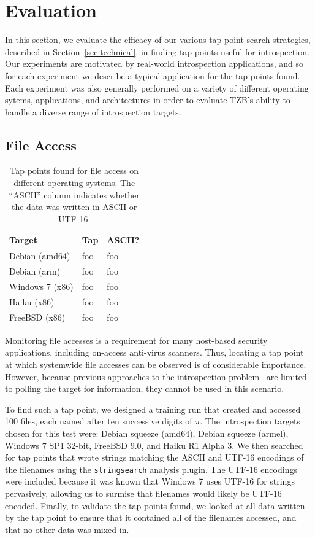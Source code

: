 \section{Evaluation}
\label{sec:eval}

In this section, we evaluate the efficacy of our various tap point search
strategies, described in Section~\ref{sec:technical}, in finding tap
points useful for introspection. Our experiments are motivated by
real-world introspection applications, and so for each experiment we
describe a typical application for the tap points found. Each experiment
was also generally performed on a variety of different operating sytems,
applications, and architectures in order to evaluate TZB's ability to
handle a diverse range of introspection targets.

\subsection{File Access}
\label{sec:eval:subsec:file}

\begin{table}
    \centering
    \begin{tabular}{|l|l|l|}
        \hline
        Target & Tap & ASCII? \\
        \hline
        Debian (amd64) & foo & foo \\ 
        Debian (arm) & foo & foo \\
        Windows 7 (x86) & foo & foo \\
        Haiku (x86) & foo & foo \\
        FreeBSD (x86) & foo & foo \\
        \hline
    \end{tabular}
\caption{Tap points found for file access on different operating
systems. The ``ASCII'' column indicates whether the data was written in
ASCII or UTF-16.}
\label{tbl:file}
\end{table}

Monitoring file accesses is a requirement for many host-based security
applications, including on-access anti-virus scanners. Thus, locating a
tap point at which systemwide file accesses can be observed is of
considerable importance. However, because previous approaches to the
introspection problem~\cite{Dolan-Gavitt:2011uq,Fu:2012fk} are limited
to polling the target for information, they cannot be used in this
scenario.

To find such a tap point, we designed a training run that created and
accessed 100 files, each named after ten successive digits of $\pi$. The
introspection targets chosen for this test were: Debian squeeze (amd64),
Debian squeeze (armel), Windows 7 SP1 32-bit, FreeBSD 9.0, and Haiku R1
Alpha 3. We then searched for tap points that wrote strings matching the
ASCII and UTF-16 encodings of the filenames using the
\texttt{stringsearch} analysis plugin. The UTF-16 encodings were
included because it was known that Windows 7 uses UTF-16 for strings
pervasively, allowing us to surmise that filenames would likely be
UTF-16 encoded. Finally, to validate the tap points found, we looked at
all data written by the tap point to ensure that it contained all of the
filenames accessed, and that no other data was mixed in.

